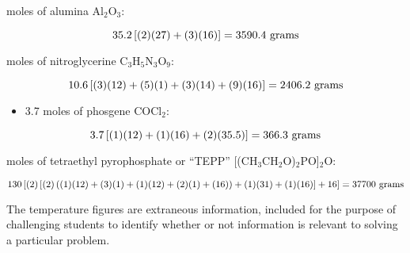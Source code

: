 





 moles of alumina Al$_{2}$O$_{3}$:

$$35.2 \left[(2)(27) + (3)(16) \right] = 3590.4 \hbox{ grams}$$

\vskip 10pt

 moles of nitroglycerine C$_{3}$H$_{5}$N$_{3}$O$_{9}$: 

$$10.6 \left[(3)(12) + (5)(1) + (3)(14) + (9)(16) \right] = 2406.2 \hbox{ grams}$$

\vskip 10pt

\noindent
\begin{itemize}
\item{} 3.7 moles of phosgene COCl$_{2}$: 
\end{itemize}

$$3.7 \left[(1)(12) + (1)(16) + (2)(35.5) \right] = 366.3 \hbox{ grams}$$

\vskip 10pt

 moles of tetraethyl pyrophosphate or ``TEPP'' [(CH$_{3}$CH$_{2}$O)$_{2}$PO]$_{2}$O: 

$$130 \left[ (2) \left[ (2) \left((1)(12) + (3)(1) + (1)(12) + (2)(1) + (16) \right) + (1)(31) + (1)(16) \right] + 16 \right] = 37700 \hbox{ grams}$$

\vskip 10pt

The temperature figures are extraneous information, included for the purpose of challenging students to identify whether or not information is relevant to solving a particular problem.




